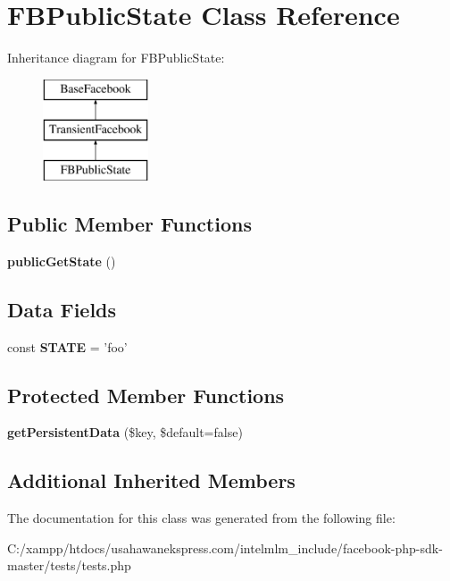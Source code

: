 \hypertarget{class_f_b_public_state}{\section{F\-B\-Public\-State Class Reference}
\label{class_f_b_public_state}
}
Inheritance diagram for F\-B\-Public\-State\-:\begin{figure}[H]
\begin{center}
\leavevmode
\includegraphics[height=3.000000cm]{class_f_b_public_state}
\end{center}
\end{figure}
\subsection*{Public Member Functions}
\begin{DoxyCompactItemize}
\item 
\hypertarget{class_f_b_public_state_a6009a8caf5dc6d980363ea7d251d0c88}{{\bfseries public\-Get\-State} ()}\label{class_f_b_public_state_a6009a8caf5dc6d980363ea7d251d0c88}

\end{DoxyCompactItemize}
\subsection*{Data Fields}
\begin{DoxyCompactItemize}
\item 
\hypertarget{class_f_b_public_state_a8b48e62b1c37150c82ec2eab8dba55e5}{const {\bfseries S\-T\-A\-T\-E} = 'foo'}\label{class_f_b_public_state_a8b48e62b1c37150c82ec2eab8dba55e5}

\end{DoxyCompactItemize}
\subsection*{Protected Member Functions}
\begin{DoxyCompactItemize}
\item 
\hypertarget{class_f_b_public_state_a2d31791ed8c3a7d09a4338aec8749a7d}{{\bfseries get\-Persistent\-Data} (\$key, \$default=false)}\label{class_f_b_public_state_a2d31791ed8c3a7d09a4338aec8749a7d}

\end{DoxyCompactItemize}
\subsection*{Additional Inherited Members}


The documentation for this class was generated from the following file\-:\begin{DoxyCompactItemize}
\item 
C\-:/xampp/htdocs/usahawanekspress.\-com/intelmlm\-\_\-include/facebook-\/php-\/sdk-\/master/tests/tests.\-php\end{DoxyCompactItemize}
